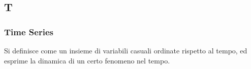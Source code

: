 \subsection*{\textbf{\hfill \Huge{T} \hfill}} 
\subsubsection*{Time Series}
Si definisce come un insieme di variabili casuali ordinate rispetto al tempo, ed esprime la dinamica di un certo fenomeno nel tempo.